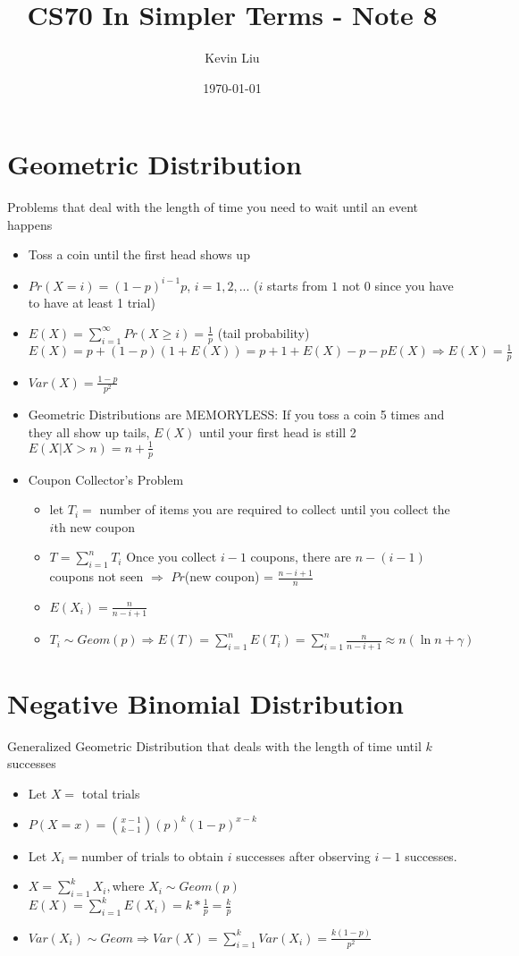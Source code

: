 \documentclass[a4paper]{article}
\title{CS70 In Simpler Terms - Note 8}
\author{Kevin Liu}
\date{\today}
\begin{document}
\maketitle

\section{Geometric Distribution}
Problems that deal with the length of time you need to wait until an event happens
\begin{itemize}
    \item Toss a coin until the first head shows up
    \item $Pr(X=i) = (1-p)^{i-1}p$, $i = 1,2,...$ ($i$ starts from $1$ not 0 since you have to have at least 1 trial)
    \item $E(X) = \sum_{i=1}^\infty Pr(X \geq i) = \frac{1}{p}$ (tail probability)\\
    $E(X) = p + (1-p)(1+E(X)) = p + 1 + E(X) -p -pE(X) \Rightarrow E(X) = \frac{1}{p}$
    \item $Var(X) = \frac{1-p}{p^2}$
    \item Geometric Distributions are MEMORYLESS: If you toss a coin 5 times and they all show up tails, $E(X)$ until your first head is still 2\\
    $E(X|X>n) = n + \frac{1}{p}$
    \item Coupon Collector's Problem
    \begin{itemize}
        \item let $T_i = $ number of items you are required to collect until you collect the $i$th new coupon
        \item $T = \sum_{i=1}^nT_i$ Once you collect $i - 1$ coupons, there are $n-(i-1)$ coupons not seen $\Rightarrow$ $Pr$(new coupon) = $\frac{n-i+1}{n}$
        \item $E(X_i) = \frac{n}{n-i+1}$
        \item $T_i \sim Geom(p) \Rightarrow E(T) = \sum_{i=1}^nE(T_i) = \sum_{i=1}^n\frac{n}{n-i+1} \approx n(\ln n + \gamma)$
    \end{itemize}
\end{itemize}

\section{Negative Binomial Distribution}
Generalized Geometric Distribution that deals with the length of time until $k$ successes
\begin{itemize}
    \item Let $X = $ total trials
    \item $P(X=x) = \binom{x-1}{k-1}(p)^{k}(1-p)^{x-k}$ 
    \item Let $X_i = $number of trials to obtain $i$ successes after observing $i-1$ successes.
    \item $X = \sum_{i=1}^kX_i, $where $X_i \sim Geom(p)$\\
    $E(X) = \sum_{i=1}^kE(X_i) = k*\frac{1}{p} = \frac{k}{p}$
    \item $Var(X_i) \sim Geom \Rightarrow Var(X) = \sum_{i = 1}^kVar(X_i) = \frac{k(1-p)}{p^2}$
\end{itemize}
\end{document}
